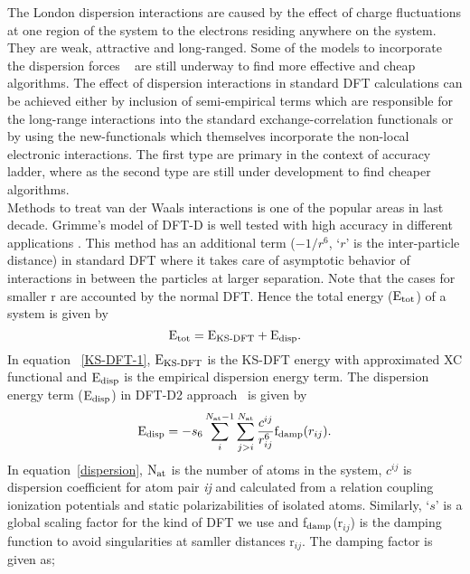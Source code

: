 The London dispersion interactions are caused by the effect of charge fluctuations at one region of the system to the electrons residing anywhere on the system. They are weak, attractive and long-ranged. Some of the models to incorporate the dispersion forces ~\citep{Grimme2006, Klime2012} are still underway to find more effective and cheap algorithms. The effect of dispersion interactions in standard DFT calculations can be achieved either by inclusion of semi-empirical terms which are responsible for the long-range interactions into the standard exchange-correlation functionals or by using the new-functionals which themselves incorporate the non-local electronic interactions. The first type are primary in the context of accuracy ladder, where as the second type are still under development to find cheaper algorithms.\\
Methods to treat van der Waals interactions is one of the popular areas in last decade. Grimme's model of DFT-D is well tested \citep{Grimme2004} with high accuracy in different applications \citep{Piacenza2005, Parac2005}. This method has an additional term ($-1/r^6$, `$r$' is the inter-particle distance) in standard DFT where it takes care of asymptotic behavior of interactions in between the particles at larger separation. Note that the cases for smaller r are accounted by the normal DFT. Hence the total energy (${\rm E}_{\rm tot}$) of a system is given by
\begin{equation}
{\rm E}_{\rm tot} = {\rm E}_{\text{KS-DFT}} + {\rm E}_{\rm disp} .
\label{KS-DFT-1}
\end{equation}
In equation ~\ref{KS-DFT-1}, ${\rm E}_{\text{KS-DFT}}$ is the KS-DFT energy with approximated XC functional and $ {\rm E}_{\rm disp}$ is the empirical dispersion energy term. The dispersion energy term (${\rm E}_{\rm disp}$) in DFT-D2 approach~\citep{Grimme2006} is given by
\begin{equation}\label{dispersion}
{\rm E}_{\rm disp} = -s_6\sum_{i}^{N_{\rm at}-1}\sum_{j>i}^{N_{\rm at}}\frac{c^{ij}}{r_{ij}^{6}}{\rm f}_{\rm damp}(r_{ij}).
\end{equation}
In equation~\ref{dispersion}, ${\rm N}_{\rm at}$ is the number of atoms in the system, $c^{ij}$ is dispersion coefficient for atom pair {\it ij} and calculated from a relation coupling ionization potentials and static polarizabilities of isolated atoms. Similarly, `$s$' is a global scaling factor for the kind of DFT we use and f$_{\rm damp}$(r$_{ij}$) is the damping function to avoid singularities at samller distances r$_{ij}$. The damping factor is given as;
